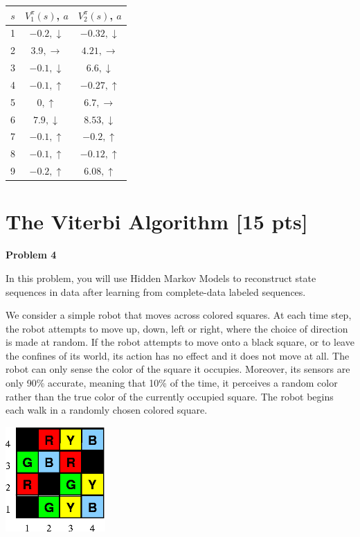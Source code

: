 \documentclass[submit]{harvardml}
\begin{document}
\begin{enumerate}
\begin{tabular}{c|c|c}
	$s$ & $V_1^\pi(s)$, $a$ & $V_2^\pi(s)$, $a$ \\
	\hline 
	1 & $-0.2, \downarrow$ & $-0.32, \downarrow$ \\
	2 & $3.9, \rightarrow$ & $4.21, \rightarrow$ \\
	3 & $-0.1, \downarrow$ & $6.6, \downarrow$ \\
	4 & $-0.1, \uparrow$ & $-0.27, \uparrow$ \\
	5 & $0, \uparrow$ & $6.7, \rightarrow$ \\
	6 & $7.9, \downarrow$ & $8.53, \downarrow$ \\
	7 & $-0.1, \uparrow$ & $-0.2, \uparrow$ \\
	8 & $-0.1, \uparrow$ & $-0.12, \uparrow$ \\
	9 & $-0.2, \uparrow$ & $6.08, \uparrow$ \\
\end{tabular} 
\end{enumerate}
\newpage

\section*{The Viterbi Algorithm [15 pts]}

{\bf Problem 4}
\medskip

In this problem, you will use Hidden Markov Models to reconstruct
state sequences in data after learning from complete-data labeled
sequences.

We consider a simple robot that moves across colored squares. At each
time step, the robot attempts to move up, down, left or right, where
the choice of direction is made at random.  If the robot attempts to
move onto a black square, or to leave the confines of its world, its
action has no effect and it does not move at all.  The robot can only
sense the color of the square it occupies.  Moreover, its sensors are
only 90\% accurate, meaning that 10\% of the time, it perceives a
random color rather than the true color of the currently occupied
square.  The robot begins each walk in a randomly chosen colored
square.


\begin{center}
  \includegraphics[width=1.5in]{robot_maze.png}
\end{center}
\end{document}
